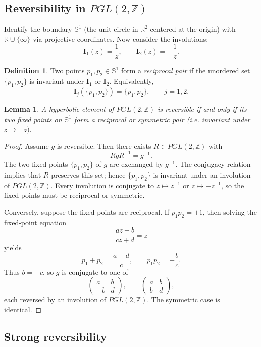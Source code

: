 \documentclass[12pt]{amsart}
\theoremstyle{plain}
\newtheorem{lemma}[theorem]{Lemma}
\theoremstyle{definition}
\newtheorem{definition}[theorem]{Definition}
\theoremstyle{remark}
\begin{document}
\subsection{Reversibility in $PGL(2,\mathbb Z)$}

Identify the boundary $\mathbb{S}^{1}$ (the unit circle in $\mathbb{R}^2$ centered at the origin) with $\mathbb{R}\cup\{\infty\}$ via projective coordinates. Now consider the involutions:
$$
\mathbf{I}_{1}(z)=\frac{1}{z}, 
\qquad 
\mathbf{I}_{2}(z)=-\frac{1}{z}.
$$

\begin{definition}
Two points $p_{1},p_{2}\in \mathbb{S}^{1}$ form a \emph{reciprocal pair} if the unordered set 
$\{p_{1},p_{2}\}$ is invariant under $\mathbf{I}_{1}$ or $\mathbf{I}_{2}$.  
Equivalently,
$$
\mathbf{I}_{j}(\{p_{1},p_{2}\})=\{p_{1},p_{2}\},\qquad j=1,2.
$$
\end{definition}

\begin{lemma}\label{PGLrev}
A hyperbolic element of $PGL(2,\mathbb Z)$ is reversible if and only if its two fixed
points on $\mathbb S^1$ form a reciprocal or symmetric pair (i.e. invariant under $z\mapsto -z)$.
\end{lemma}
\begin{proof}
Assume $g$ is reversible.  
Then there exists $R\in PGL(2,\mathbb{Z})$ with
$$
RgR^{-1}=g^{-1}.
$$
The two fixed points $\{p_{1},p_{2}\}$ of $g$ are exchanged by $g^{-1}$.  
The conjugacy relation implies that $R$ preserves this set; hence $\{p_{1},p_{2}\}$ is invariant under an involution of $PGL(2,\mathbb{Z})$.  
Every involution is conjugate to $z\mapsto z^{-1}$ or $z\mapsto -z^{-1}$, so the fixed points must be reciprocal or symmetric.

Conversely, suppose the fixed points are reciprocal.  
If $p_{1}p_{2}=\pm1$, then solving the fixed-point equation
$$
\frac{az+b}{cz+d}=z
$$
yields
$$
p_{1}+p_{2}=\frac{a-d}{c},\qquad
p_{1}p_{2}=-\frac{b}{c}.
$$
Thus $b=\pm c$, so $g$ is conjugate to one of
$$
\begin{pmatrix} a & b \\ -b & d\end{pmatrix},\qquad
\begin{pmatrix} a & b \\ b & d\end{pmatrix},
$$
each reversed by an involution of $PGL(2,\mathbb{Z})$.  
The symmetric case is identical.
\end{proof}

\subsection{Strong reversibility}
\end{document}
